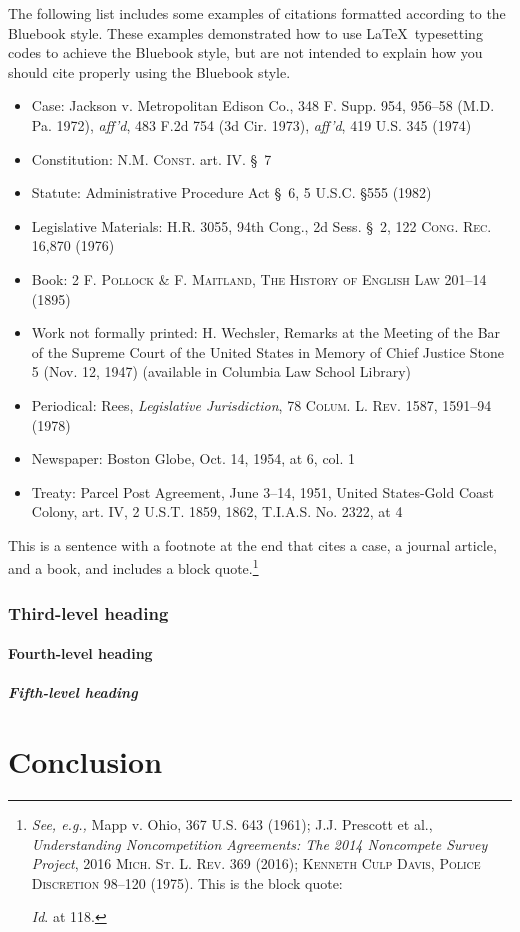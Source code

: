 \documentclass[letterpaper,12pt,twoside]{article}
\begin{document}
\lipsum[3]

The following list includes some examples of citations formatted according to the Bluebook style. These examples demonstrated how to use \LaTeX~typesetting codes to achieve the Bluebook style, but are not intended to explain how you should cite properly using the Bluebook style.

	\begin{itemize}
		\item Case: Jackson v. Metropolitan Edison Co., 348 F. Supp. 954, 956--58 (M.D. Pa. 1972), \emph{aff'd}, 483 F.2d 754 (3d Cir. 1973), \emph{aff'd}, 419 U.S. 345 (1974)
		\item Constitution: \textsc{N.M. Const.} art. IV. \S~7
		\item Statute: Administrative Procedure Act \S~6, 5 U.S.C. \S 555 (1982)
		\item Legislative Materials: H.R. 3055, 94th Cong., 2d Sess. \S~2, 122 \textsc{Cong. Rec.} 16,870 (1976)
		\item Book: 2 \textsc{F. Pollock \& F. Maitland, The History of English Law} 201--14 (1895)
		\item Work not formally printed: H. Wechsler, Remarks at the Meeting of the Bar of the Supreme Court of the United States in Memory of Chief Justice Stone 5 (Nov. 12, 1947) (available in Columbia Law School Library)
		\item Periodical: Rees, \emph{Legislative Jurisdiction}, 78 \textsc{Colum. L. Rev.} 1587, 1591--94 (1978)
		\item	Newspaper: Boston Globe, Oct. 14, 1954, at 6, col. 1
		\item Treaty: Parcel Post Agreement, June 3--14, 1951, United States-Gold Coast Colony, art. IV, 2 U.S.T. 1859, 1862, T.I.A.S. No. 2322, at 4
	\end{itemize}

This is a sentence with a footnote at the end that cites a case, a journal article, and a book, and includes a block quote.\footnote{\emph{See, e.g.,} Mapp v. Ohio, 367 U.S. 643 (1961); J.J. Prescott et al., \emph{Understanding Noncompetition Agreements: The 2014 Noncompete Survey Project}, 2016 \textsc{Mich. St. L. Rev.} 369 (2016); \textsc{Kenneth Culp Davis, Police Discretion 98--120 (1975)}. This is the block quote:
	\begin{quote}
		\lipsum[4]
	\end{quote}
	\emph{Id}. at 118.}

\subsubsection{Third-level heading}

\lipsum[5]

\paragraph{Fourth-level heading}

\noindent\lipsum[6]

\subparagraph{Fifth-level heading}

\noindent\lipsum[7]

\section*{Conclusion}

\lipsum[8]
\end{document}
